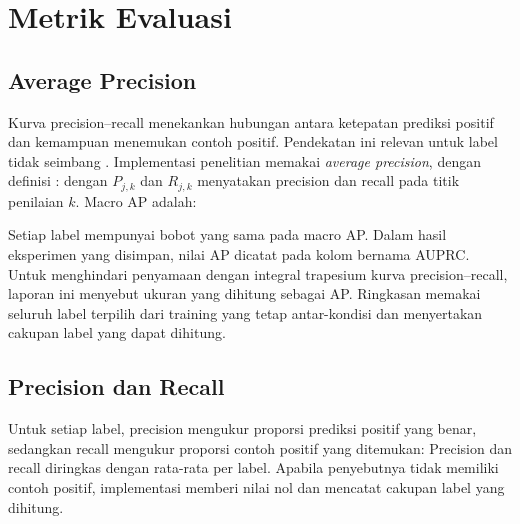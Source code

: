 \section{Metrik Evaluasi}

\subsection{Average Precision}

Kurva precision--recall menekankan hubungan antara ketepatan prediksi positif dan kemampuan menemukan contoh positif. Pendekatan ini relevan untuk label tidak seimbang \cite{saito2015}. Implementasi penelitian memakai \textit{average precision}, dengan definisi \cite{sklearnap2026}:
dengan $P_{j,k}$ dan $R_{j,k}$ menyatakan precision dan recall pada titik penilaian $k$. Macro AP adalah:

Setiap label mempunyai bobot yang sama pada macro AP. Dalam hasil eksperimen yang disimpan, nilai AP dicatat pada kolom bernama AUPRC. Untuk menghindari penyamaan dengan integral trapesium kurva precision--recall, laporan ini menyebut ukuran yang dihitung sebagai AP. Ringkasan memakai seluruh label terpilih dari training yang tetap antar-kondisi dan menyertakan cakupan label yang dapat dihitung.

\subsection{Precision dan Recall}

Untuk setiap label, precision mengukur proporsi prediksi positif yang benar, sedangkan recall mengukur proporsi contoh positif yang ditemukan:
Precision dan recall diringkas dengan rata-rata per label. Apabila penyebutnya tidak memiliki contoh positif, implementasi memberi nilai nol dan mencatat cakupan label yang dihitung.

